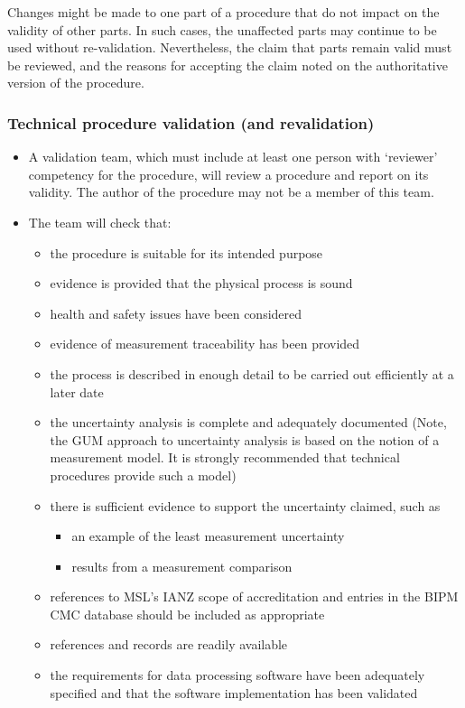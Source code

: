 Changes might be made to one part of a procedure that do not impact on the validity of other parts. In such cases, the unaffected parts may continue to be used without re-validation. Nevertheless, the claim that parts remain valid must be reviewed, and the reasons for accepting the claim noted on the authoritative version of the procedure.

\subsubsection{Technical procedure validation (and revalidation)}
\label{sss:tp_validation}
\begin{itemize}
\item A validation team, which must include at least one person with ‘reviewer’ competency for the procedure, will review a procedure and report on its validity.  The author of the procedure may not be a member of this team.
\item The team will check that: 
\begin{itemize}
\item the procedure is suitable for its intended purpose
\item evidence is provided that the physical process is sound
\item health and safety issues have been considered
\item evidence of measurement traceability has been provided
\item the process is described in enough detail to be carried out efficiently at a later date
\item the uncertainty analysis is complete and adequately documented (Note, the GUM approach to uncertainty analysis is based on the notion of a measurement model. It is strongly recommended that technical procedures provide such a model)
\item there is sufficient evidence to support the uncertainty claimed, such as
\begin{itemize}
\item an example of the least measurement uncertainty
\item results from a measurement comparison
\end{itemize}
\item references to MSL’s IANZ scope of accreditation and entries in the BIPM CMC database should be included as appropriate
\item references and records are readily available 
\item the requirements for data processing software have been adequately specified and that the software implementation has been validated

\end{itemize}
\end{itemize}
